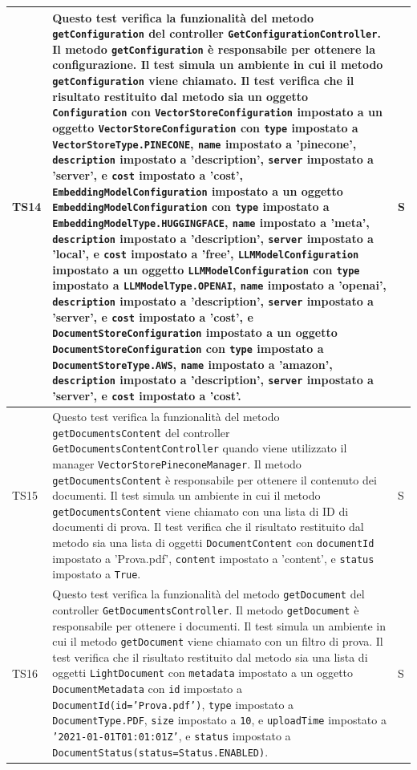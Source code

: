 \documentclass[10pt, a4paper]{article}
\begin{document}
\begin{xltabular}{\textwidth}{p{0.12\textwidth}|X|p{0.12\textwidth}}
    \hline
    TS14 & Questo test verifica la funzionalità del metodo \texttt{getConfiguration} del controller \texttt{GetConfigurationController}. Il metodo \texttt{getConfiguration} è responsabile per ottenere la configurazione. Il test simula un ambiente in cui il metodo \texttt{getConfiguration} viene chiamato. Il test verifica che il risultato restituito dal metodo sia un oggetto \texttt{Configuration} con \texttt{VectorStoreConfiguration} impostato a un oggetto \texttt{VectorStoreConfiguration} con \texttt{type} impostato a \texttt{VectorStoreType.PINECONE}, \texttt{name} impostato a 'pinecone', \texttt{description} impostato a 'description', \texttt{server} impostato a 'server', e \texttt{cost} impostato a 'cost', \texttt{EmbeddingModelConfiguration} impostato a un oggetto \texttt{EmbeddingModelConfiguration} con \texttt{type} impostato a \texttt{EmbeddingModelType.HUGGINGFACE}, \texttt{name} impostato a 'meta', \texttt{description} impostato a 'description', \texttt{server} impostato a 'local', e \texttt{cost} impostato a 'free', \texttt{LLMModelConfiguration} impostato a un oggetto \texttt{LLMModelConfiguration} con \texttt{type} impostato a \texttt{LLMModelType.OPENAI}, \texttt{name} impostato a 'openai', \texttt{description} impostato a 'description', \texttt{server} impostato a 'server', e \texttt{cost} impostato a 'cost', e \texttt{DocumentStoreConfiguration} impostato a un oggetto \texttt{DocumentStoreConfiguration} con \texttt{type} impostato a \texttt{DocumentStoreType.AWS}, \texttt{name} impostato a 'amazon', \texttt{description} impostato a 'description', \texttt{server} impostato a 'server', e \texttt{cost} impostato a 'cost'.  & S \\
    \hline
    TS15 & Questo test verifica la funzionalità del metodo \texttt{getDocumentsContent} del controller \texttt{GetDocumentsContentController} quando viene utilizzato il manager \texttt{VectorStorePineconeManager}. Il metodo \texttt{getDocumentsContent} è responsabile per ottenere il contenuto dei documenti. Il test simula un ambiente in cui il metodo \texttt{getDocumentsContent} viene chiamato con una lista di ID di documenti di prova. Il test verifica che il risultato restituito dal metodo sia una lista di oggetti \texttt{DocumentContent} con \texttt{documentId} impostato a 'Prova.pdf', \texttt{content} impostato a 'content', e \texttt{status} impostato a \texttt{True}.  & S \\
    \hline
    TS16 & Questo test verifica la funzionalità del metodo \texttt{getDocument} del controller \texttt{GetDocumentsController}. Il metodo \texttt{getDocument} è responsabile per ottenere i documenti. Il test simula un ambiente in cui il metodo \texttt{getDocument} viene chiamato con un filtro di prova. Il test verifica che il risultato restituito dal metodo sia una lista di oggetti \texttt{LightDocument} con \texttt{metadata} impostato a un oggetto \texttt{DocumentMetadata} con \texttt{id} impostato a \texttt{DocumentId(id='Prova.pdf')}, \texttt{type} impostato a \texttt{DocumentType.PDF}, \texttt{size} impostato a \texttt{10}, e \texttt{uploadTime} impostato a \texttt{'2021-01-01T01:01:01Z'}, e \texttt{status} impostato a \texttt{DocumentStatus(status=Status.ENABLED)}.  & S \\

\end{xltabular}
\end{document}
